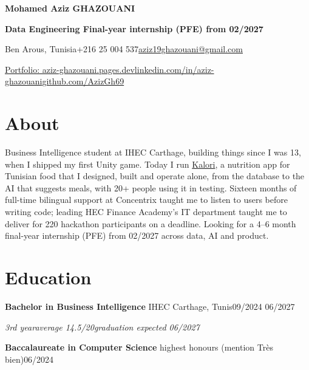 \documentclass[10pt]{article}
\newcommand{\entry}[3]{\par\vspace{2pt}\textbf{#1}#2\hfill{\color{soft}#3}\par}
\newcommand{\sub}[1]{{\itshape\color{soft}#1\par}}
\newcommand{\sep}{\enspace\textperiodcentered\enspace}
\begin{document}
{\fontsize{21}{24}\selectfont\bfseries Mohamed Aziz GHAZOUANI\par}
\vspace{2pt}
{\color{accent}\bfseries\fontsize{11}{13}\selectfont Data Engineering \textbar{} Final-year internship (PFE) from 02/2027\par}
\vspace{2pt}
{\small Ben Arous, Tunisia\sep +216 25 004 537\sep \href{mailto:aziz19ghazouani@gmail.com}{aziz19ghazouani@gmail.com}\par
\href{https://aziz-ghazouani.pages.dev}{Portfolio: aziz-ghazouani.pages.dev}\sep \href{https://www.linkedin.com/in/aziz-ghazouani/}{linkedin.com/in/aziz-ghazouani}\sep \href{https://github.com/AzizGh69}{github.com/AzizGh69}\par}
\section{About}
Business Intelligence student at IHEC Carthage, building things since I was 13, when I shipped my first Unity game. Today I run \href{https://kalori-app.com}{Kalori}, a nutrition app for Tunisian food that I designed, built and operate alone, from the database to the AI that suggests meals, with 20+ people using it in testing. Sixteen months of full-time bilingual support at Concentrix taught me to listen to users before writing code; leading HEC Finance Academy's IT department taught me to deliver for 220 hackathon participants on a deadline. Looking for a 4--6 month final-year internship (PFE) from 02/2027 across data, AI and product.
\section{Education}
\entry{Bachelor in Business Intelligence}{ \textendash{} IHEC Carthage, Tunis}{09/2024 \textendash{} 06/2027}
\sub{3rd year\sep average 14.5/20\sep graduation expected 06/2027}
\entry{Baccalaureate in Computer Science}{ \textendash{} highest honours (mention Très bien)}{06/2024}
\end{document}

